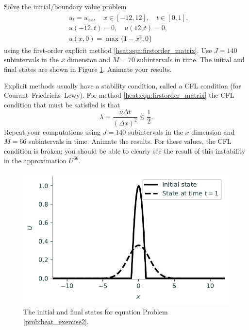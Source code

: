 \begin{problem}
\label{prob:heat_exercise2}
Solve the initial/boundary value problem
\begin{align}
	\begin{split}
	&{ } u_t = u_{xx}, \quad x \in [-12,12],\quad t \in [0,1], \\
	&{ } u(-12,t) = 0,\quad u(12,t) = 0,\\
	&{ } u(x,0) = \max\{1 - x^2,0\}
	\end{split}
\end{align}
using the first-order explicit method \eqref{heat:eqn:firstorder_matrix}.
Use $J = 140$ subintervals in the $x$ dimension and $M = 70$ subintervals in time.
The initial and final states are shown in Figure \ref{fig:heatexercise2}.
Animate your results.

Explicit methods usually have a stability condition, called a CFL condition (for Courant--Friedrichs--Lewy).
For method \eqref{heat:eqn:firstorder_matrix} the CFL condition that must be satisfied is that
\[\lambda=\frac{\nu \Delta t}{ (\Delta x)^2} \leq \frac{1}{2}.\]
Repeat your computations using $J = 140$ subintervals in the $x$ dimension and $M = 66$ subintervals in time.
Animate the results.
For these values, the CFL condition is broken; you should be able to clearly see the result of this instability in the approximation $U^{66}$.
\end{problem}

\begin{figure}
\centering
\includegraphics[width=\textwidth]{figures/heatexercise2.pdf}
\caption{The initial and final states for equation Problem \ref{prob:heat_exercise2}.}
\label{fig:heatexercise2}
\end{figure}


